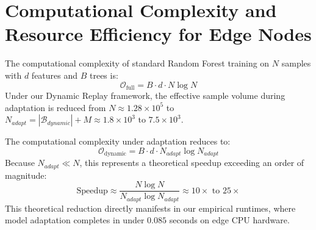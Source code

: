 \section{Computational Complexity and Resource Efficiency for Edge Nodes}
The computational complexity of standard Random Forest training on $N$ samples with $d$ features and $B$ trees is:
\begin{equation}
\mathcal{O}_{\text{full}} = B \cdot d \cdot N \log N
\end{equation}
Under our Dynamic Replay framework, the effective sample volume during adaptation is reduced from $N \approx 1.28 \times 10^5$ to $N_{adapt} = |\mathcal{B}_{dynamic}| + M \approx 1.8 \times 10^3 \text{ to } 7.5 \times 10^3$.

The computational complexity under adaptation reduces to:
\begin{equation}
\mathcal{O}_{\text{dynamic}} = B \cdot d \cdot N_{adapt} \log N_{adapt}
\end{equation}
Because $N_{adapt} \ll N$, this represents a theoretical speedup exceeding an order of magnitude:
\begin{equation}
\text{Speedup} \approx \frac{N \log N}{N_{adapt} \log N_{adapt}} \approx 10\times \text{ to } 25\times
\end{equation}
This theoretical reduction directly manifests in our empirical runtimes, where model adaptation completes in under $0.085$ seconds on edge CPU hardware.
